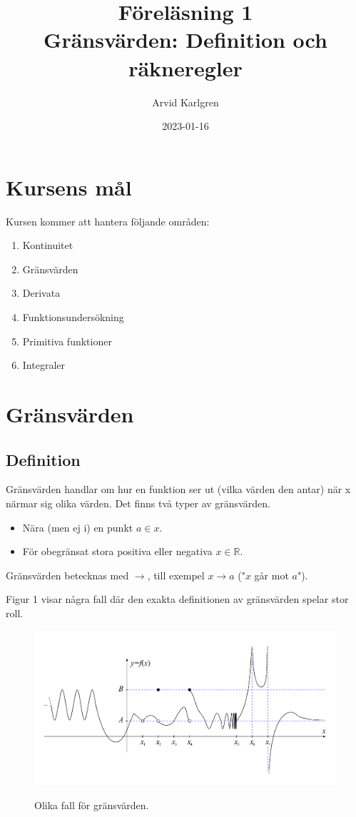 \documentclass[swedish]{article}
\author{Arvid Karlgren}
\title{Föreläsning 1\\
       \LARGE Gränsvärden: Definition och räkneregler}
\date{2023-01-16}
\begin{document}
\maketitle


\pagebreak

\section{Kursens mål}

Kursen kommer att hantera följande områden:

\begin{enumerate}
    \item Kontinuitet
    \item Gränsvärden
    \item Derivata
    \item Funktionsundersökning
    \item Primitiva funktioner
    \item Integraler
\end{enumerate}

\pagebreak

\section{Gränsvärden}

\subsection{Definition}

Gränsvärden handlar om hur en funktion ser ut (vilka värden den antar) när x närmar sig olika värden. Det finns två typer av gränsvärden.

\begin{itemize}
    \item{Nära (men ej i) en punkt $a\in x$.}
    \item{För obegränsat stora positiva eller negativa $x\in \mathbb{R}$.}
\end{itemize}

Gränsvärden betecknas med $\to$, till exempel $x \to a$ ("$x$ går mot $a$").

Figur 1 visar några fall där den exakta definitionen av gränsvärden spelar stor roll. 

\begin{figure}[h!]
    \includegraphics[width=\linewidth]{figur1.png}
    \label{fig:figur1}
    \caption{Olika fall för gränsvärden.}
\end{figure}
\end{document}
